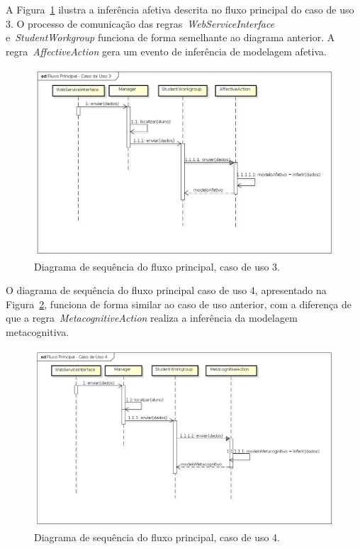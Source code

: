 A Figura~\ref{fig:dss-uc3-fluxo-principal} ilustra a inferência afetiva descrita no fluxo principal do caso de uso 3. O processo de comunicação das regras~\emph{WebServiceInterface} e~\emph{StudentWorkgroup} funciona de forma semelhante ao diagrama anterior. A regra~\emph{AffectiveAction} gera um evento de inferência de modelagem afetiva.

\begin{figure}
	\centering
	\includegraphics[scale=0.52]{images/dss-uc3-fluxo-principal.png}
	\caption{Diagrama de sequência do fluxo principal, caso de uso 3.}
	\label{fig:dss-uc3-fluxo-principal}
\end{figure}

O diagrama de sequência do fluxo principal caso de uso 4, apresentado na Figura~\ref{fig:dss-uc4-fluxo-principal}, funciona de forma similar ao caso de uso anterior, com a diferença de que a regra~\emph{MetacognitiveAction} realiza a inferência da modelagem metacognitiva.

\begin{figure}
	\centering
	\includegraphics[scale=0.52]{images/dss-uc4-fluxo-principal.png}
	\caption{Diagrama de sequência do fluxo principal, caso de uso 4.}
	\label{fig:dss-uc4-fluxo-principal}
\end{figure}

